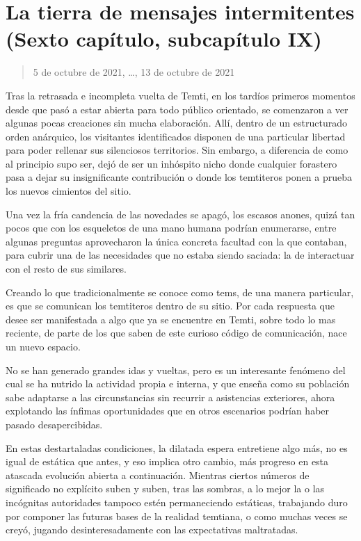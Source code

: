 \documentclass[
  spanish,
]{book}
\begin{document}
\hypertarget{la-tierra-de-mensajes-intermitentes-sexto-capuxedtulo-subcapuxedtulo-ix}{%
\section{La tierra de mensajes intermitentes (Sexto capítulo, subcapítulo IX)}\label{la-tierra-de-mensajes-intermitentes-sexto-capuxedtulo-subcapuxedtulo-ix}}

\begin{quote}
5 de octubre de 2021, \ldots, 13 de octubre de 2021
\end{quote}

Tras la retrasada e incompleta vuelta de Temti, en los tardíos primeros momentos desde que pasó a estar abierta para todo público orientado, se comenzaron a ver algunas pocas creaciones sin mucha elaboración. Allí, dentro de un estructurado orden anárquico, los visitantes identificados disponen de una particular libertad para poder rellenar sus silenciosos territorios. Sin embargo, a diferencia de como al principio supo ser, dejó de ser un inhóspito nicho donde cualquier forastero pasa a dejar su insignificante contribución o donde los temtiteros ponen a prueba los nuevos cimientos del sitio.

Una vez la fría candencia de las novedades se apagó, los escasos anones, quizá tan pocos que con los esqueletos de una mano humana podrían enumerarse, entre algunas preguntas aprovecharon la única concreta facultad con la que contaban, para cubrir una de las necesidades que no estaba siendo saciada: la de interactuar con el resto de sus similares.

Creando lo que tradicionalmente se conoce como tems, de una manera particular, es que se comunican los temtiteros dentro de su sitio. Por cada respuesta que desee ser manifestada a algo que ya se encuentre en Temti, sobre todo lo mas reciente, de parte de los que saben de este curioso código de comunicación, nace un nuevo espacio.

No se han generado grandes idas y vueltas, pero es un interesante fenómeno del cual se ha nutrido la actividad propia e interna, y que enseña como su población sabe adaptarse a las circunstancias sin recurrir a asistencias exteriores, ahora explotando las ínfimas oportunidades que en otros escenarios podrían haber pasado desapercibidas.

En estas destartaladas condiciones, la dilatada espera entretiene algo más, no es igual de estática que antes, y eso implica otro cambio, más progreso en esta atascada evolución abierta a continuación. Mientras ciertos números de significado no explícito suben y suben, tras las sombras, a lo mejor la o las incógnitas autoridades tampoco estén permaneciendo estáticas, trabajando duro por componer las futuras bases de la realidad temtiana, o como muchas veces se creyó, jugando desinteresadamente con las expectativas maltratadas.
\end{document}
